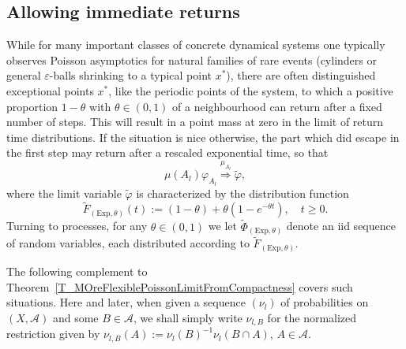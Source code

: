\documentclass[AHL,Unicode,longabstracts]{cedram}
\newcommand{\clA}{\mathcal{A}}
\newcommand{\Expl}{\mathrm{Exp}}
\begin{document}
\subsection{Allowing immediate returns}
While for many important classes of concrete dynamical systems one typically observes Poisson asymptotics for natural families of rare events (cylinders or general $\varepsilon$-balls shrinking to a typical point $x^{\ast}$), there are often distinguished exceptional points $x^{\ast}$, like the periodic points of the system, to which a positive proportion $1-\theta$ with $\theta\in(0,1)$ of a neighbourhood can return after a fixed number of steps. This will result in a point mass at zero in the limit of return time distributions. If the situation is nice otherwise, the part which did escape in the first step may return after a rescaled exponential time, so that
\[
\mu(A_{l})\varphi_{A_{l}}
\overset{\mu_{A_{l}}}{\Longrightarrow}\widetilde{\varphi},
\]
where the limit variable $\widetilde{\varphi}$ is characterized by the distribution function
\begin{equation}\label{Eq_DefOneDimDFComp}
\widetilde{F}_{(\Expl,\theta)}(t):=(1-\theta)+\theta\left(1-e^{-\theta t}\right), \quad t\geq0. 
\end{equation}
Turning to processes, for any $\theta\in(0,1)$ we let $\widetilde{\Phi }_{(\Expl,\theta)}$ denote an iid sequence of random variables, each distributed according to $\widetilde{F}_{(\Expl,\theta)}$.

The following complement to Theorem~\ref{T_MOreFlexiblePoissonLimitFromCompactness} covers such situations. Here and later, when given a sequence $(\nu_{l})$ of probabilities on $(X,\clA)$ and some $B\in\clA$, we shall simply write $\nu _{l,B}$ for the normalized restriction given by $\nu_{l,B}(A):=\nu_{l} (B)^{-1}\nu_{l}(B\cap A)$, $A\in\clA$.
\end{document}
